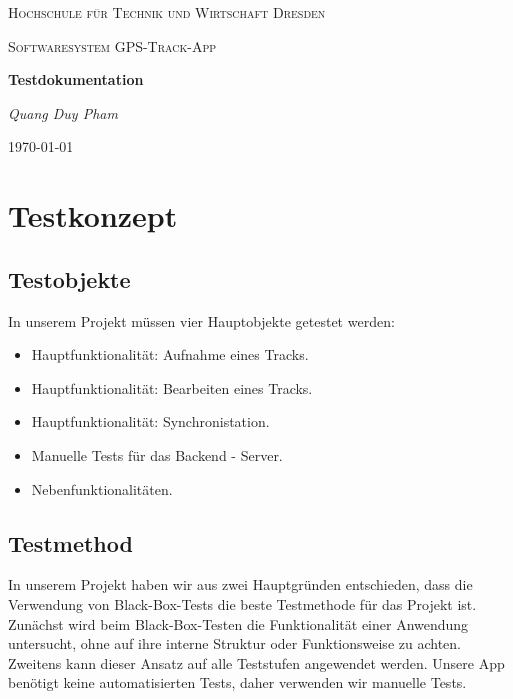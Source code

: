\documentclass{article}
\begin{document}
\begin{titlepage}
    \centering
    {\scshape\LARGE Hochschule für Technik und Wirtschaft Dresden \par}
    \vspace{1cm}
    {\scshape\Large Softwaresystem \glqq GPS-Track-App\grqq\par}
    \vspace{1.5cm}
    {\huge\bfseries Testdokumentation\par}
    \vspace{2cm}
    {\Large\itshape Quang Duy Pham\par}
    \vfill

    {\large \today\par}
\end{titlepage}
\tableofcontents
\newpage

\section{Testkonzept}
\subsection{Testobjekte}
	In unserem Projekt müssen vier Hauptobjekte getestet werden:
	\begin{itemize}
		\item Hauptfunktionalität: Aufnahme eines Tracks.
		\item Hauptfunktionalität: Bearbeiten eines Tracks.
		\item Hauptfunktionalität: Synchronistation.
		\item Manuelle Tests für das Backend - Server.
		\item Nebenfunktionalitäten.
	\end{itemize}

\subsection{Testmethod}
	In unserem Projekt haben wir aus zwei Hauptgründen entschieden, dass die Verwendung von Black-Box-Tests die beste Testmethode für das Projekt ist. Zunächst wird beim Black-Box-Testen die Funktionalität einer Anwendung untersucht, ohne auf ihre interne Struktur oder Funktionsweise zu achten. Zweitens kann dieser Ansatz auf alle Teststufen angewendet werden. Unsere App benötigt keine automatisierten Tests, daher verwenden wir manuelle Tests. \par
\end{document}
